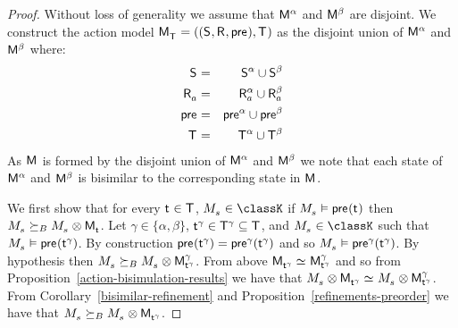 \begin{proof}
Without loss of generality we assume that $\aModel[\alpha]$ and $\aModel[\beta]$ are disjoint.
We construct the action model $\aPModelAndTuple{\aStatesT}$ as the disjoint union of $\aModel[\alpha]$ and $\aModel[\beta]$ where:
    \begin{eqnarray*}
        \aStates &=& \aStates[\alpha] \cup \aStates[\beta]\\
        \aAccessibilityA &=& \aAccessibilityA[\alpha] \cup \aAccessibilityA[\beta]\\
        \aPrecondition &=& \aPrecondition[\alpha] \cup \aPrecondition[\beta]\\
        \aStatesT &=& \aStatesT[\alpha] \cup \aStatesT[\beta]
    \end{eqnarray*}
As $\aModel$ is formed by the disjoint union of $\aModel[\alpha]$ and $\aModel[\beta]$ we note that each state of $\aModel[\alpha]$ and $\aModel[\beta]$ is bisimilar to the corresponding state in $\aModel$.

We first show that for every $\aStateT \in \aStatesT$, $\kPModel{\kStateS} \in \classK$ if $\kPModel{\kStateS} \entails \aPrecondition(\aStateT)$ then $\kPModel{\kStateS} \simulatesBs \kPModel{\kStateS} \exec \aPModel{\aStateT}$.
Let $\gamma \in \{\alpha, \beta\}$, $\aStateT[\gamma] \in \aStatesT[\gamma] \subseteq \aStatesT$, and $\kPModel{\kStateS} \in \classK$ such that $\kPModel{\kStateS} \entails \aPrecondition(\aStateT[\gamma])$.
By construction $\aPrecondition(\aStateT[\gamma]) = \aPrecondition[\gamma](\aStateT[\gamma])$ and so $\kPModel{\kStateS} \entails \aPrecondition[\gamma](\aStateT[\gamma])$. 
By hypothesis then $\kPModel{\kStateS} \simulatesBs \kPModel{\kStateS} \exec \aPModel[\gamma]{\aStateT[\gamma]}$.
From above $\aPModel{\aStateT[\gamma]} \bisimilar \aPModel[\gamma]{\aStateT[\gamma]}$ and so from Proposition~\ref{action-bisimulation-results} we have that $\kPModel{\kStateS} \exec \aPModel{\aStateT[\gamma]} \bisimilar \kPModel{\kStateS} \exec \aPModel[\gamma]{\aStateT[\gamma]}$.
From Corollary~\ref{bisimilar-refinement} and Proposition~\ref{refinements-preorder} we have that $\kPModel{\kStateS} \simulatesBs \kPModel{\kStateS} \exec \aPModel{\aStateT[\gamma]}$.


\end{proof}
